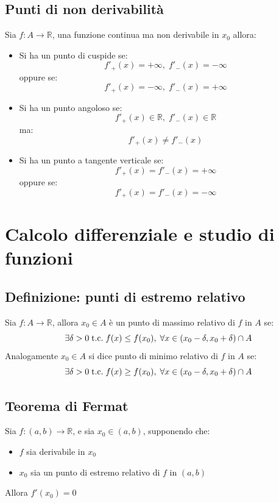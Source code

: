\documentclass[a4paper,12pt,openright]{book}
\begin{document}
    \section{Punti di non derivabilità}
    Sia $f: A \longrightarrow \mathbb{R}$, una funzione continua ma non derivabile in $x_0$ allora:
    \begin{itemize}
    	\item Si ha un punto di cuspide se:
    	\[f'_+(x) = +\infty, \; f'_-(x) = -\infty \]
    	oppure se:
    	\[f'_+(x) = -\infty, \; f'_-(x) = +\infty \]
    	\item Si ha un punto angoloso se:
    	\[f'_+(x) \in \mathbb{R}, \; f'_-(x) \in \mathbb{R}\]
    	ma:
    	\[f'_+(x) \not = f'_-(x)\]    
    	\item Si ha un punto a tangente verticale se:
    	\[f'_+(x) = f'_-(x) = +\infty\]
    	oppure se:
    	\[f'_+(x) = f'_-(x) = -\infty\]
    \end{itemize}
    
    \chapter{Calcolo differenziale e studio di funzioni}
    
    \section{Definizione: punti di estremo relativo}
	Sia $f: A \longrightarrow \mathbb{R}$, allora $x_0 \in A$ è un punto di massimo relativo di $f$ in $A$ se:
	\[\exists \delta > 0 \;\text{t.c.}\; f(x) \leq f(x_0), \; \forall x \in (x_0 - \delta, x_0 + \delta) \cap A\]
	Analogamente $x_0 \in A$ si dice punto di minimo relativo di $f$ in $A$ se:
	\[\exists \delta > 0 \;\text{t.c.}\; f(x) \geq f(x_0), \; \forall x \in (x_0 - \delta, x_0 + \delta) \cap A\]
	
	\section{Teorema di Fermat}
	Sia $f: (a, b) \longrightarrow \mathbb{R}$, e sia $x_0 \in (a, b)$, supponendo che:
	\begin{itemize}
		\item $f$ sia derivabile in $x_0$
		\item $x_0$ sia un punto di estremo relativo di $f$ in $(a, b)$
	\end{itemize}
	Allora $f'(x_0) = 0$
	
\end{document}
